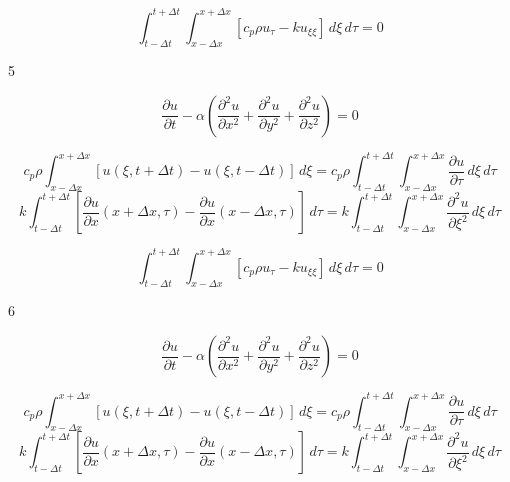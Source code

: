 \documentclass{article}
\begin{document}
\begin{equation}
\int_{t-\Delta t}^{t+\Delta t}\int_{x-\Delta x}^{x+\Delta x} [c_p\rho u_\tau - k u_{\xi\xi}]\, d\xi \, d\tau = 0
\end{equation}

\newpage


\begin{center}
\Huge{5}
\end{center}

\vskip 2cm
\begin{equation}
\frac{\partial u}{\partial t} -\alpha\left(\frac{\partial^2u}{\partial x^2}+\frac{\partial^2u}{\partial y^2}+\frac{\partial^2u}{\partial z^2}\right)=0
\end{equation}

\begin{equation}
c_p\rho \int_{x-\Delta x}^{x+\Delta x} [u(\xi,t+\Delta t)-u(\xi,t-\Delta t)]\, d\xi = c_p\rho\int_{t-\Delta t}^{t+\Delta t}\int_{x-\Delta x}^{x+\Delta x} \frac{\partial u}{\partial\tau}\,d\xi \, d\tau
\end{equation}
\begin{equation}
k\int_{t-\Delta t}^{t+\Delta t}\left[\frac{\partial u}{\partial x}(x+\Delta x,\tau)-\frac{\partial u}{\partial x}(x-\Delta x,\tau)\right]\,d\tau = k\int_{t-\Delta t}^{t+\Delta t}\int_{x-\Delta x}^{x+\Delta x}\frac{\partial^2u}{\partial\xi^2}\,d\xi\, d\tau
\end{equation}

\begin{equation}
\int_{t-\Delta t}^{t+\Delta t}\int_{x-\Delta x}^{x+\Delta x} [c_p\rho u_\tau - k u_{\xi\xi}]\, d\xi \, d\tau = 0
\end{equation}

\newpage


\begin{center}
\Huge{6}
\end{center}

\vskip 2cm
\begin{equation}
\frac{\partial u}{\partial t} -\alpha\left(\frac{\partial^2u}{\partial x^2}+\frac{\partial^2u}{\partial y^2}+\frac{\partial^2u}{\partial z^2}\right)=0
\end{equation}

\begin{equation}
c_p\rho \int_{x-\Delta x}^{x+\Delta x} [u(\xi,t+\Delta t)-u(\xi,t-\Delta t)]\, d\xi = c_p\rho\int_{t-\Delta t}^{t+\Delta t}\int_{x-\Delta x}^{x+\Delta x} \frac{\partial u}{\partial\tau}\,d\xi \, d\tau
\end{equation}
\begin{equation}
k\int_{t-\Delta t}^{t+\Delta t}\left[\frac{\partial u}{\partial x}(x+\Delta x,\tau)-\frac{\partial u}{\partial x}(x-\Delta x,\tau)\right]\,d\tau = k\int_{t-\Delta t}^{t+\Delta t}\int_{x-\Delta x}^{x+\Delta x}\frac{\partial^2u}{\partial\xi^2}\,d\xi\, d\tau
\end{equation}
\end{document}

